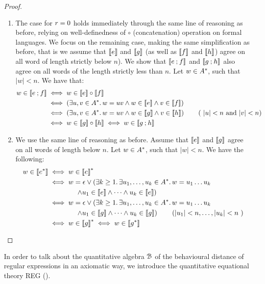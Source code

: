 \begin{proof}
\begin{enumerate}
    \item The case for $r = 0$ holds immediately through the same line of reasoning as before, relying on well-definedness of $\circ$ (concatenation) operation on formal languages. We focus on the remaining case, making the same simplification as before, that is we assume that $\left\llbracket{e}\right\rrbracket$ and $\left\llbracket{g}\right\rrbracket$ (as well as $\left\llbracket{f}\right\rrbracket$ and $\left\llbracket{h}\right\rrbracket$) agree on all word of length strictly below $n$). We show that $\left\llbracket{e \mathbin{;}f}\right\rrbracket$ and $\left\llbracket{g \mathbin{;}h}\right\rrbracket$ also agree on all words of the length strictly less than $n$. Let $w \in {A}^{\ast}$, such that $|w|<n$. We have that: 
    \begin{align*}
        w \in \left\llbracket{e \mathbin{;}f}\right\rrbracket &\iff w \in \left\llbracket{e}\right\rrbracket \circ \left\llbracket{f}\right\rrbracket\\ &\iff
        \left(\exists u,v \in {A}^\ast \ldotp w=uv \wedge w \in \left\llbracket{e}\right\rrbracket \wedge v \in \left\llbracket{f}\right\rrbracket\right)\\
        &\iff  \left(\exists u,v \in {A}^\ast \ldotp w=uv \wedge w \in \left\llbracket{g}\right\rrbracket \wedge v \in \left\llbracket{h}\right\rrbracket\right) \tag{ $|u|< n$ and $|v| < n$} \\
        &\iff w \in \left\llbracket{g}\right\rrbracket \circ \left\llbracket{h}\right\rrbracket \iff w \in \left\llbracket{g \mathbin{;}h}\right\rrbracket
    \end{align*}
    \item We use the same line of reasoning as before. Assume that $\left\llbracket{e}\right\rrbracket$ and $\left\llbracket{g}\right\rrbracket$ agree on all words of length below $n$. Let $w \in {A}^\ast$, such that $|w| < n$. We have the following:
    \begin{align*}
        w \in \left\llbracket{e^\ast}\right\rrbracket &\iff w \in \left\llbracket{e}\right\rrbracket^\ast\\ 
        &\iff w = \epsilon \vee \left(\exists k \geq 1 \ldotp \exists u_1, \dots, u_k \in {A}^\ast \ldotp w = u_1\dots u_k \right.\\&\left. \qquad\qquad\wedge u_1 \in \left\llbracket{e}\right\rrbracket \wedge \dots \wedge u_k \in \left\llbracket{e}\right\rrbracket\right) \\
        &\iff w = \epsilon \vee \left(\exists k \geq 1 \ldotp \exists u_1, \dots, u_k \in {A}^\ast\ldotp w = u_1\dots u_k \right.\\&\left. \qquad\qquad\wedge u_1 \in \left\llbracket{g}\right\rrbracket \wedge \dots \wedge u_k \in \left\llbracket{g}\right\rrbracket\right) \tag{$|u_1| < n, \dots, |u_k| < n$ }\\
        &\iff w \in \left\llbracket{g}\right\rrbracket^\ast \iff w \in \left\llbracket{g^*}\right\rrbracket\qedhere
    \end{align*}
\end{enumerate}
\end{proof}
In order to talk about the quantitative algebra $\mathcal{B}$ of the behavioural distance of regular expressions in an axiomatic way, we introduce the quantitative equational theory \textsf{REG} ().

